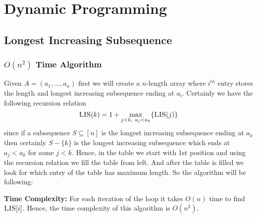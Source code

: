 \chapter{Dynamic Programming}
\section{Longest Increasing Subsequence}
\begin{algoprob}
\end{algoprob}
\subsection{\texorpdfstring{$O(n^2)$}{O(n2)} Time Algorithm}
Given $A=(a_1,\dots, a_n)$ first we will create a $n$-length array where $i^{th}$ entry stores the length and longest increasing subsequence ending at $a_i$. Certainly we have the following recursion relation$$\textsc{LIS}(k)=1+\max\limits_{\substack{j<k,\  a_j<a_k}}\{\textsc{LIS}(j)\}$$since if a subsequence $S\subseteq [n]$ is the longest increasing subsequence ending at $a_k$ then certainly $S-\{k\}$ is the longest increasing subsequence which ends at $a_j<a_k$ for some $j<k$. Hence, in the table we start with 1st position and using the recursion relation we fill the table from left. And after the table is filled we look for which entry of the table has maximum length. So the algorithm will be following:

\begin{algorithm}[H]
	\DontPrintSemicolon
\caption{$(A)$}
\end{algorithm}\parinf
\textbf{Time Complexity:} For each iteration of the loop it takes $O(n)$ time to find $\textsc{LIS}[i]$. Hence, the time complexity of this algorithm is $O(n^2)$. \parinn
